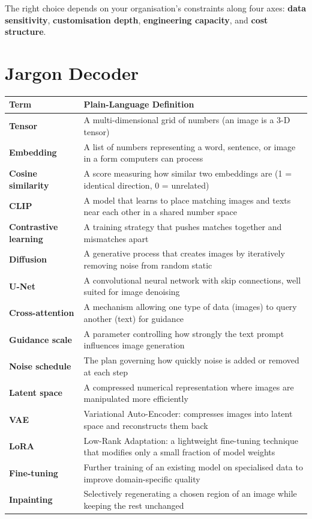 \documentclass[11pt,a4paper]{article}
\begin{document}
The right choice depends on your organisation's constraints along four
axes: \textbf{data sensitivity}, \textbf{customisation depth},
\textbf{engineering capacity}, and \textbf{cost structure}.


\section{Jargon Decoder}
\label{sec:jargon}

\begin{center}
\renewcommand{\arraystretch}{1.3}
\small
\begin{tabular}{@{} >{\bfseries}p{3.5cm} p{9cm} @{}}
\toprule
Term & Plain-Language Definition \\
\midrule
Tensor & A multi-dimensional grid of numbers (an image is a 3-D tensor) \\
Embedding & A list of numbers representing a word, sentence, or image in a form computers can process \\
Cosine similarity & A score measuring how similar two embeddings are (1 = identical direction, 0 = unrelated) \\
CLIP & A model that learns to place matching images and texts near each other in a shared number space \\
Contrastive learning & A training strategy that pushes matches together and mismatches apart \\
Diffusion & A generative process that creates images by iteratively removing noise from random static \\
U-Net & A convolutional neural network with skip connections, well suited for image denoising \\
Cross-attention & A mechanism allowing one type of data (images) to query another (text) for guidance \\
Guidance scale & A parameter controlling how strongly the text prompt influences image generation \\
Noise schedule & The plan governing how quickly noise is added or removed at each step \\
Latent space & A compressed numerical representation where images are manipulated more efficiently \\
VAE & Variational Auto-Encoder: compresses images into latent space and reconstructs them back \\
LoRA & Low-Rank Adaptation: a lightweight fine-tuning technique that modifies only a small fraction of model weights \\
Fine-tuning & Further training of an existing model on specialised data to improve domain-specific quality \\
Inpainting & Selectively regenerating a chosen region of an image while keeping the rest unchanged \\
\bottomrule
\end{tabular}
\end{center}
\end{document}
